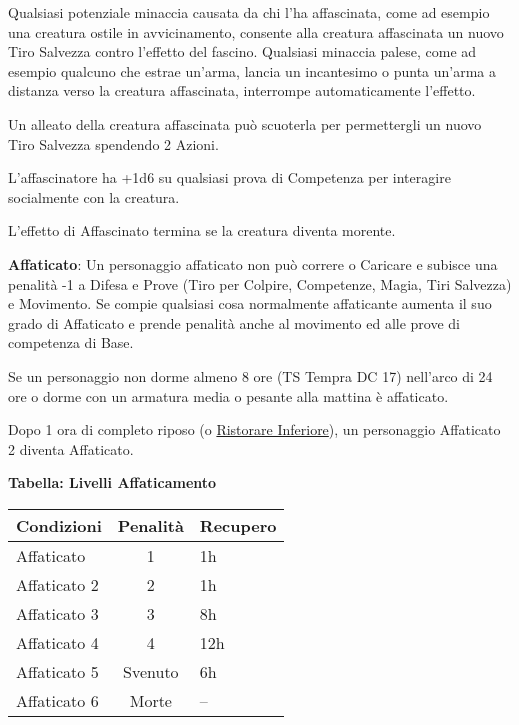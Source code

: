 \begin{multicols}{2}
Qualsiasi potenziale minaccia causata da chi l'ha affascinata, come ad esempio una creatura ostile in avvicinamento, consente alla creatura affascinata un nuovo Tiro Salvezza contro l'effetto del fascino. Qualsiasi minaccia palese, come ad esempio qualcuno che estrae un'arma, lancia un incantesimo o punta un'arma a distanza verso la creatura affascinata, interrompe automaticamente l'effetto.

Un alleato della creatura affascinata può scuoterla per permettergli un nuovo Tiro Salvezza spendendo 2 Azioni.

L'affascinatore ha +1d6 su qualsiasi prova di Competenza per interagire socialmente con la creatura.

L'effetto di Affascinato termina se la creatura diventa morente.

\textbf{Affaticato}\hypertarget{affaticato}{}\label{affaticato}: Un personaggio affaticato non può correre o Caricare e subisce una penalità -1 a Difesa e Prove (Tiro per Colpire, Competenze, Magia, Tiri Salvezza) e Movimento. Se compie qualsiasi cosa normalmente affaticante aumenta il suo grado di Affaticato e prende penalità anche al movimento ed alle prove di competenza di Base.

Se un personaggio non dorme almeno 8 ore (TS Tempra DC 17) nell'arco di 24 ore o dorme con un armatura media o pesante alla mattina è affaticato.

Dopo 1 ora di completo riposo (o \hyperlink{Ristorare Inferiore}{Ristorare Inferiore}), un personaggio Affaticato 2 diventa Affaticato.

\medskip

\textbf{Tabella: Livelli Affaticamento}

\medskip

\noindent\begin{tabularx}{\linewidth}{lcl}
	\toprule
\textbf{Condizioni}& \textbf{Penalità}&\textbf{Recupero}\\
\toprule
Affaticato 		&	1 		&	1h\\
Affaticato 2	&	2		&	1h\\
Affaticato 3	&	3		&	8h\\
Affaticato 4	&	4		&	12h\\
Affaticato 5	&	Svenuto	&	6h\\
Affaticato 6	&	Morte	&	--
\end{tabularx}

%
%
%


\end{multicols}
